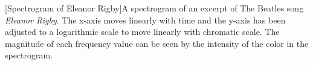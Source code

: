 [Spectrogram of Eleanor Rigby]A spectrogram of an excerpt of The Beatles song \textit{Eleanor Rigby}. The x-axis moves linearly with time and the y-axis has been adjusted to a logarithmic scale to move linearly with chromatic scale. The magnitude of each frequency value can be seen by the intensity of the color in the spectrogram.
